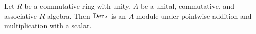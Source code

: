 \begin{proposition}
  Let $R$ be a commutative ring with unity,
  $A$ be a unital, commutative, and associative $R$-algebra.
  Then ${\rm Der}_A$ is an $A$-module under pointwise addition and
  multiplication with a scalar.
\end{proposition}
